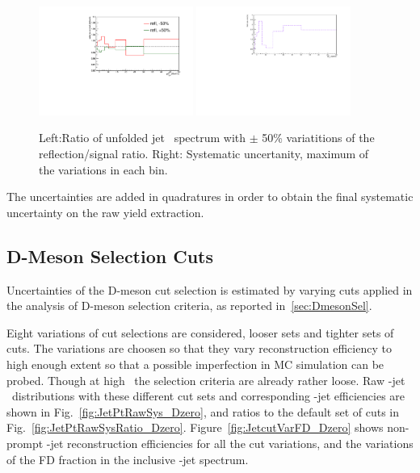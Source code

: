 \begin{figure}[bth]
\begin{center}
\includegraphics[width=0.45\textwidth]{pPbcuts_2sig/reflections/RawYield_reflections_ratio.pdf}
\includegraphics[width=0.45\textwidth]{pPbcuts_2sig/reflections/RawYield_reflections_sys.pdf}
\caption{Left:Ratio of unfolded jet \pt\ spectrum with $\pm$ 50\% variatitions of the reflection/signal ratio. Right: Systematic uncertanity, maximum of the variations in each bin.} 
\label{fig:JetPtSys_Dzero_Refl}
\end{center}
\end{figure}


The uncertainties are added in quadratures in order to obtain the final systematic uncertainty on the raw yield extraction. 

\subsection{D-Meson Selection Cuts}
Uncertainties of the D-meson cut selection is estimated by varying cuts applied in the analysis of D-meson selection criteria, as reported in~\ref{sec:DmesonSel}. 

Eight variations of cut selections are considered, {} looser sets and {} tighter sets of cuts. The variations are choosen so that they vary \Dzero reconstruction efficiency to high enough extent so that a possible imperfection in MC simulation can be probed. Though at high \ptd\ the selection criteria are already rather loose.
Raw \Dzero-jet \pt\ distributions with these different cut sets and corresponding \Dzero-jet efficiencies are shown in Fig.~\ref{fig:JetPtRawSys_Dzero}, and ratios to the default set of cuts in Fig.~\ref{fig:JetPtRawSysRatio_Dzero}.
Figure~\ref{fig:JetcutVarFD_Dzero} shows non-prompt \Dzero-jet reconstruction efficiencies for all the cut variations, and the variations of the FD fraction in the inclusive \Dzero-jet spectrum.

